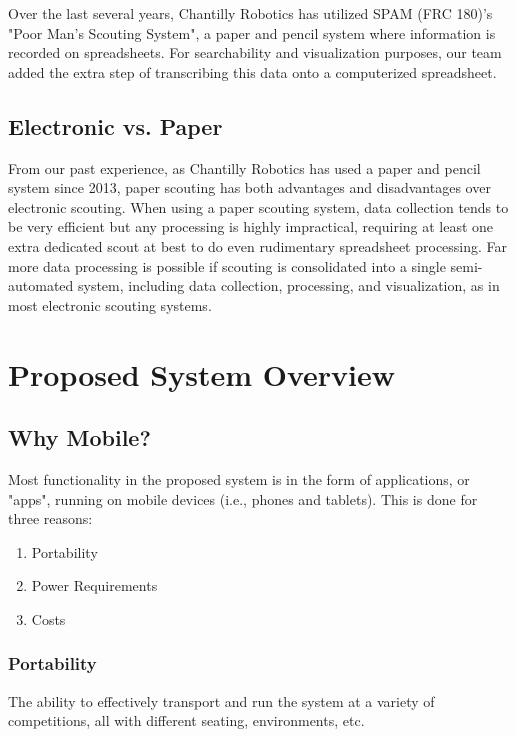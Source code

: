 \documentclass[11pt]{report}
\begin{document}
Over the last several years, Chantilly Robotics has utilized SPAM (FRC 180)'s "Poor Man's Scouting System", a paper and pencil system where information is recorded on spreadsheets. For searchability and visualization purposes, our team added the extra step of transcribing this data onto a computerized spreadsheet.

\subsection{Electronic vs. Paper}

From our past experience, as Chantilly Robotics has used a paper and pencil system since 2013, paper scouting has both advantages and disadvantages over electronic scouting. When using a paper scouting system, data collection tends to be very efficient but any processing is highly impractical, requiring at least one extra dedicated scout at best to do even rudimentary spreadsheet processing. Far more data processing is possible if scouting is consolidated into a single semi-automated system, including data collection, processing, and visualization, as in most electronic scouting systems.


\section{Proposed System Overview}

\subsection{Why Mobile?}

Most functionality in the proposed system is in the form of applications, or "apps", running on mobile devices (i.e., phones and tablets). This is done for three reasons:

\begin{enumerate}
\item Portability
\item Power Requirements
\item Costs
\end{enumerate}

\subsubsection*{Portability}

The ability to effectively transport and run the system at a variety of competitions, all with different seating, environments, etc.
\end{document}
